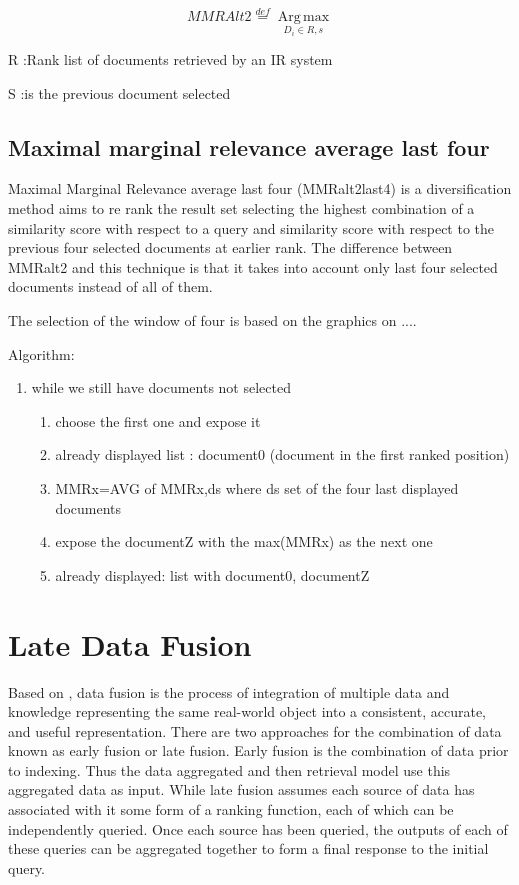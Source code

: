\begin{equation}
MMRAlt2\overset{def}{=}\operatorname*{Arg \, \max}_{D_{i}\in R,s}
\end{equation}


R :Rank list of documents retrieved by an IR system

S :is the previous document selected


\subsection{Maximal marginal relevance average last four}

Maximal Marginal Relevance average last four (MMRalt2last4) is a diversification method aims to re rank the result set selecting the highest combination of a similarity score with respect to a query and similarity score with respect to the previous four selected documents at earlier rank. The difference between MMRalt2 and this technique is that it takes into account only last four selected documents instead of all of them.

The selection of the window of four is based on the graphics on ....

Algorithm:
\begin{enumerate}
\item while we still have documents not selected
	\begin{enumerate}
	\item choose the first one and expose it
	\item already displayed list : document0 (document in the first ranked position)
	\item MMRx=AVG of MMRx,ds where ds set of the four last displayed documents
	\item expose the documentZ with the max(MMRx) as the next one
	\item already displayed: list with document0, documentZ
	\end{enumerate}
\end{enumerate}


\section{Late Data Fusion}

Based on \cite{Wilkins}, data fusion is the process of integration of multiple data and knowledge representing the same real-world object into a consistent, accurate, and useful representation. There are two approaches for the combination of data known as early fusion or late fusion. Early fusion is the combination of data prior to indexing. Thus the data aggregated and then retrieval model use this aggregated data as input. While late fusion assumes each source of data has associated with it some form of a ranking function, each of which can be independently queried. Once each source has been queried, the outputs of each of these queries can be aggregated together to form a final response to the initial query.

